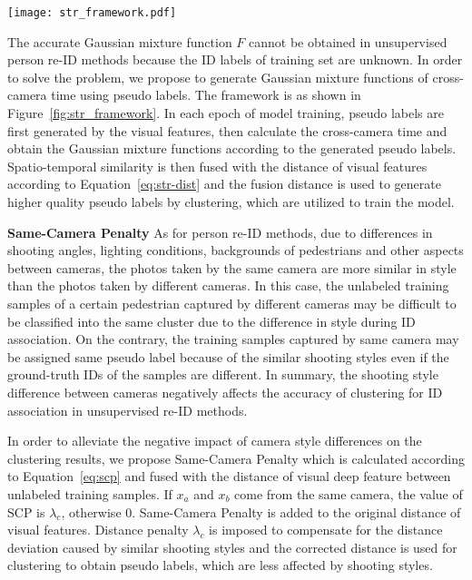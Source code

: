 \documentclass[10pt,twocolumn,letterpaper]{article}
\begin{document}
\begin{figure*}
    \centering
    \texttt{[image: str\_framework.pdf]}
    \caption{The pipeline of model training using Spatio-Temporal Similarity module. At the start of each training epoch, the pseudo labels are firstly generated according to the visual features and then obtain the Gaussian mixture functions for camera network. Spatio-temporal similarity is fused with visual features and the generated fusion distance is used to generate more accurate pseudo labels, which are utilized for model training.}
    \label{fig:str_framework}
\end{figure*}

The accurate Gaussian mixture function $F$ cannot be obtained in unsupervised person re-ID methods because the ID labels of training set are unknown. In order to solve the problem, we propose to generate Gaussian mixture functions of cross-camera time using pseudo labels. The framework is as shown in Figure~\ref{fig:str_framework}. In each epoch of model training, pseudo labels are first generated by the visual features, then calculate the cross-camera time and obtain the Gaussian mixture functions according to the generated pseudo labels. Spatio-temporal similarity is then fused with the distance of visual features according to Equation~\ref{eq:str-dist} and the fusion distance is used to generate higher quality pseudo labels by clustering, which are utilized to train the model.

\noindent \textbf{Same-Camera Penalty}
As for person re-ID methods, due to differences in shooting angles, lighting conditions, backgrounds of pedestrians and other aspects between cameras, the photos taken by the same camera are more similar in style than the photos taken by different cameras. In this case, the unlabeled training samples of a certain pedestrian captured by different cameras may be difficult to be classified into the same cluster due to the difference in style during ID association. On the contrary, the training samples captured by same camera may be assigned same pseudo label because of the similar shooting styles even if the ground-truth IDs of the samples are different. In summary, the shooting style difference between cameras negatively affects the accuracy of clustering for ID association in unsupervised re-ID methods.

In order to alleviate the negative impact of camera style differences on the clustering results, we propose Same-Camera Penalty which is calculated according to Equation~\ref{eq:scp} and fused with the distance of visual deep feature between unlabeled training samples. If $x_a$ and $x_b$ come from the same camera, the value of SCP is $\lambda_c$, otherwise 0. Same-Camera Penalty is added to the original distance of visual features. Distance penalty $\lambda_c$ is imposed to compensate for the distance deviation caused by similar shooting styles and the corrected distance is used for clustering to obtain pseudo labels, which are less affected by shooting styles.
\end{document}
